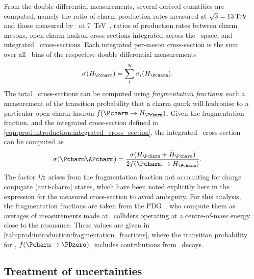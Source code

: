 From the double differential measurements, several derived quantities are 
computed, namely the ratio of charm production rates measured at $\sqrts = 
\SI{13}{\TeV}$ and those measured by \lhcb\ at 
\SI{7}{\TeV}~\cite{LHCb-PAPER-2012-041}, ratios of production rates between 
charm mesons, open charm hadron cross-sections integrated across the \pTy\ 
space, and integrated \ccbar\ cross-sections.
Each integrated per-meson cross-section is the sum over all \pTy\ bins of the 
respective double differential measurements
\begin{equation}
  \xsec{(\PHc)} =
    \sum_{i}^{N} \xsec_{i}(\PHc).
  \label{eqn:prod:introduction:integrated_cross_section}
\end{equation}
The total \ccbar\ cross-sections can be computed using \emph{fragmentation 
  fractions}; each a measurement of the transition probability that a charm 
quark will hadronise to a particular open charm hadron $f(\cToHc)$.
Given the fragmentation fraction, and the integrated cross-section defined in 
\cref{eqn:prod:introduction:integrated_cross_section}, the integrated \ccbar\ 
cross-section can be computed as
\begin{equation}
  \xsec{(\ccbar)} = \frac{\xsec(\PHc + \APHc)}{2f(\cToHc)}.
  \label{eqn:prod:introduction:ccbar_cross_section}
\end{equation}
The factor $\sfrac{1}{2}$ arises from the fragmentation fraction not accounting 
for charge conjugate (anti-charm) states, which have been noted explicitly here 
in the expression for the measured cross-section to avoid ambiguity.
For this analysis, the fragmentation fractions are taken from the 
\ac{PDG}~\cite{PDG2008}, who compute them as averages of measurements made at 
\epem\ colliders operating at a centre-of-mass energy close to the 
\PUpsilonFourS resonance.
These values are given in \cref{tab:prod:introduction:fragmentation_fractions}, 
where the transition probability for \PDzero, $f(\decay{\Pcharm}{\PDzero})$, 
includes contributions from \DstToDzpi\ decays.

\begin{table}
  \caption[Charm hadron fragmentation fractions]{%
    Charm hadron fragmentation fractions~\cite{PDG2008}.
    Here, \PHc\ does not include the charge conjugate state.
  }
  \label{tab:prod:introduction:fragmentation_fractions}
  \centering
  
\end{table}

\subsection{Treatment of uncertainties}
\label{chap:prod:introduction:uncertainties}

